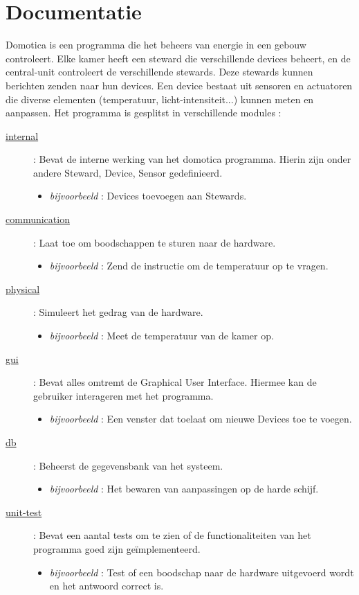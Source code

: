 \documentclass{article}
\begin{document}
\part*{Documentatie}
Domotica is een programma die het beheers van energie in een gebouw controleert. Elke kamer heeft een steward die verschillende devices beheert, en de central-unit controleert de verschillende stewards. Deze stewards kunnen berichten zenden naar hun devices. Een device bestaat uit sensoren en actuatoren die diverse elementen (temperatuur, licht-intensiteit...) kunnen meten en aanpassen. \newline 
Het programma is gesplitst in verschillende modules :

\begin{description}
\item[\hyperlink{internal}{internal}] : Bevat de interne werking van het domotica programma. Hierin zijn onder andere Steward, Device, Sensor gedefinieerd.
\begin{itemize}
	\item \emph{bijvoorbeeld} : Devices toevoegen aan Stewards.
\end{itemize}

\item[\hyperlink{communication}{communication}] : Laat toe om boodschappen te sturen naar de hardware.
\begin{itemize}
	\item \emph{bijvoorbeeld} : Zend de instructie om de temperatuur op te vragen.
\end{itemize}

\item[\hyperlink{physical}{physical}] : Simuleert het gedrag van de hardware.
\begin{itemize}
	\item \emph{bijvoorbeeld} : Meet de temperatuur van de kamer op.
\end{itemize}

\item[\hyperlink{gui}{gui}] : Bevat alles omtremt de Graphical User Interface. Hiermee kan de gebruiker interageren met het programma.
\begin{itemize}
	\item \emph{bijvoorbeeld} : Een venster dat toelaat om nieuwe Devices toe te voegen.
\end{itemize}

\item[\hyperlink{db}{db}] : Beheerst de gegevensbank van het systeem.
\begin{itemize}
	\item \emph{bijvoorbeeld} : Het bewaren van aanpassingen op de harde schijf.
\end{itemize}

\item[\hyperlink{unit-test}{unit-test}] : Bevat een aantal tests om te zien of de functionaliteiten van het programma goed zijn geïmplementeerd.
\begin{itemize}
	\item \emph{bijvoorbeeld} : Test of een boodschap naar de hardware uitgevoerd wordt en het antwoord correct is. 
\end{itemize}
\end{description}
\end{document}

